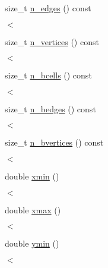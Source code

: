 \begin{DoxyCompactItemize}
size\+\_\+t \hyperlink{classMeshFramework2D_1_1Mesh2D_afa8109b737b52cd21d2d613ef0daaeda}{n\+\_\+edges} () const
\begin{DoxyCompactList}\small\item\em $<$ \end{DoxyCompactList}\item 
size\+\_\+t \hyperlink{classMeshFramework2D_1_1Mesh2D_a4db4af0b69594ff5d875546253fb8c7f}{n\+\_\+vertices} () const
\begin{DoxyCompactList}\small\item\em $<$ \end{DoxyCompactList}\item 
size\+\_\+t \hyperlink{classMeshFramework2D_1_1Mesh2D_a746cfac777f671bad0b1471b30c3f073}{n\+\_\+bcells} () const
\begin{DoxyCompactList}\small\item\em $<$ \end{DoxyCompactList}\item 
size\+\_\+t \hyperlink{classMeshFramework2D_1_1Mesh2D_a01f8db7422e63ae8ea716009f3c4b199}{n\+\_\+bedges} () const
\begin{DoxyCompactList}\small\item\em $<$ \end{DoxyCompactList}\item 
size\+\_\+t \hyperlink{classMeshFramework2D_1_1Mesh2D_a0ee8ac1f4ab5535f3688095237506c9c}{n\+\_\+bvertices} () const
\begin{DoxyCompactList}\small\item\em $<$ \end{DoxyCompactList}\item 
double \hyperlink{classMeshFramework2D_1_1Mesh2D_a325a72849b7003426dd1c2bf4dcb9c84}{xmin} ()
\begin{DoxyCompactList}\small\item\em $<$ \end{DoxyCompactList}\item 
double \hyperlink{classMeshFramework2D_1_1Mesh2D_a354b64e62d528a2ef5927a47f6b577fb}{xmax} ()
\begin{DoxyCompactList}\small\item\em $<$ \end{DoxyCompactList}\item 
double \hyperlink{classMeshFramework2D_1_1Mesh2D_ac0553768ea5fd52ee6898ec64ce39c83}{ymin} ()
\begin{DoxyCompactList}\small\item\em $<$ \end{DoxyCompactList}\item 

\end{DoxyCompactItemize}
